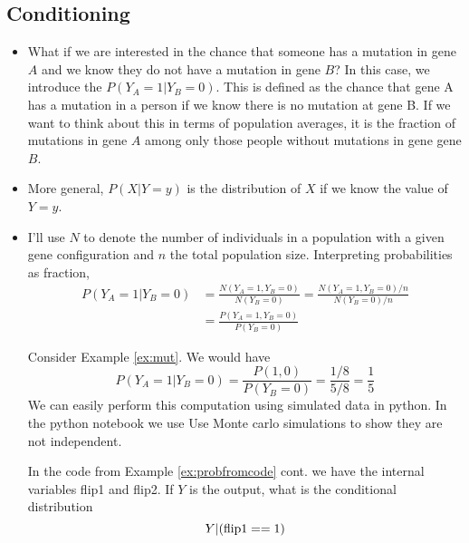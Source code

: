 \subsection{Conditioning}
\begin{itemize}
\item What if we are interested in the chance that someone has a mutation in gene $A$ and we know they do not have a mutation in gene $B$?  In this case, we introduce the  $P(Y_A=1|Y_B=0)$. This is defined as the chance that gene A has a mutation in a person if we know there is no mutation at gene B. If we want to think about this in terms of population averages, it is the fraction of mutations in gene $A$ among only those people without mutations in gene gene $B$. 
\item More general, $P(X|Y=y)$ is the distribution of $X$ if we know the value of $Y=y$. 
\item I'll use $N$ to denote the number of individuals in a population with a given gene configuration and $n$ the total population size. Interpreting probabilities as fraction, 
\begin{align*}
P(Y_A=1|Y_B=0) &= \frac{N(Y_A = 1,Y_B= 0)}{N(Y_B=0)} = \frac{N(Y_A = 1,Y_B = 0)/n}{N(Y_B=0)/n} \\
&= \frac{P(Y_A = 1,Y_B = 0)}{P(Y_B = 0)}
\end{align*}


\begin{example}
Consider Example \ref{ex:mut}. We would have 
\begin{equation*}
P(Y_A = 1|Y_B = 0) = \frac{P(1,0)}{P(Y_B = 0)} = \frac{1/8}{5/8} = \frac{1}{5} 
\end{equation*}
We can easily perform this computation using simulated data in python. In the python notebook we use Use Monte carlo simulations to show they are not independent. 
\end{example}



\begin{example}
In the code from Example \ref{ex:probfromcode} cont. we have the internal variables flip1 and flip2. If $Y$ is the output, what is the conditional distribution 
\begin{equation*}
Y|({\rm flip1}==1)
\end{equation*}
\end{example}


\end{itemize}
